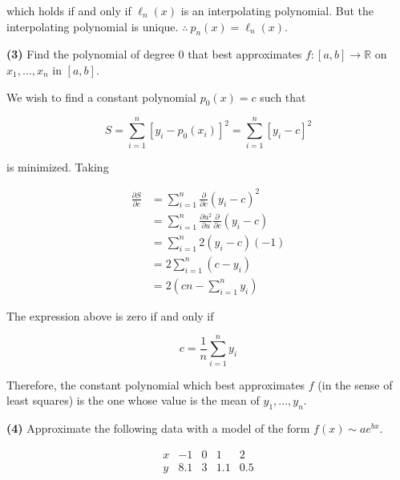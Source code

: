 \documentclass[12pt]{article}
\theoremstyle{definition}
\begin{document}
which holds if and only if $\ell_n(x)$ is an interpolating polynomial. But the
interpolating polynomial is unique. $\therefore ~ p_n(x) = \ell_n(x)$.


\pagebreak 

\begin{shaded}
    \textbf{(3)} Find the polynomial of degree $0$ that best approximates 
    $f : [a, b] \to \mathbb{R}$ on $x_1, \ldots, x_n$ in $[a, b]$.
\end{shaded}

We wish to find a constant polynomial $p_0(x) = c$ such that 

\begin{equation*}
    S = \sum_{i=1}^n \left[ y_i - p_0(x_i) \right]^2 = \sum_{i=1}^n \left[ y_i - c
    \right]^2
\end{equation*}

is minimized. Taking 

\begin{align*}
    \frac{\partial S}{\partial c} 
    &= \sum_{i=1}^n \frac{\partial }{\partial c}
    (y_i - c)^2\\ 
    &=\sum_{i=1}^n \frac{\partial u^2}{\partial u} \frac{\partial }{\partial
    c}(y_i - c) \\ 
    &= \sum_{i=1}^n 2(y_i - c)(-1) \\ 
    &=2 \sum_{i=1}^n (c - y_i) \\ 
    &=2 \left( cn - \sum_{i=1}^n y_i \right) 
\end{align*}

The expression above is zero if and only if 

\begin{equation*}
    c = \frac{1}{n} \sum_{i=1}^n y_i
\end{equation*}

Therefore, the constant polynomial which best approximates $f$ (in the sense of
least squares) is the one whose value is the mean of $y_1, \ldots, y_n$.

\pagebreak 

\begin{shaded}
    \textbf{(4)} Approximate the following data with a model of the form $f(x) \sim ae^{bx}$. 


     \begin{equation*}
    \begin{array}{c|c|c|c|c}
        x & -1 & 0 & 1 & 2\\ 
        y & 8.1 & 3 & 1.1 & 0.5 
     \end{array}
     \end{equation*}
\end{shaded}
\end{document}
